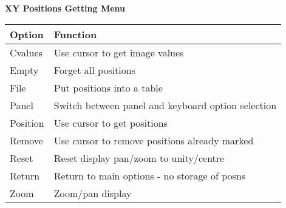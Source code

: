 {{                                                                               
{\bf \hspace*{4ex} XY Positions Getting Menu }\newline\vspace*{3mm}
\hspace*{4ex}\begin{tabular}{|l|p{4.5in}|}\hline
  Option   & Function \\ \hline
  Cvalues   & Use cursor to get image values \\
  Empty   &  Forget all positions \\
  File    &  Put positions into a table \\
  Panel   &  Switch between panel and keyboard option selection \\
  Position & Use cursor to get positions \\
  Remove   & Use cursor to remove positions already marked \\
  Reset    & Reset display pan/zoom to unity/centre \\
  Return   & Return to main options - no storage of posns \\
  Zoom     & Zoom/pan display \\ \hline
\end{tabular}                                                                               
                                                                               
}}
